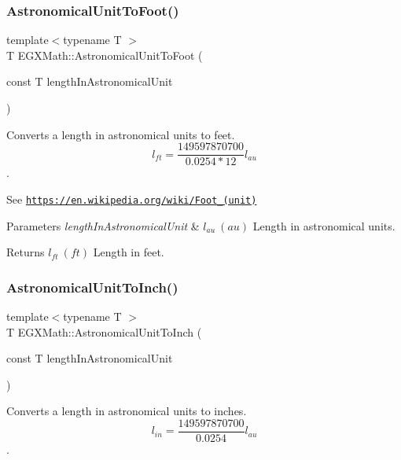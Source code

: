 \subsubsection{\texorpdfstring{Astronomical\+Unit\+To\+Foot()}{AstronomicalUnitToFoot()}}
{\footnotesize\ttfamily template$<$typename T $>$ \\
T E\+G\+X\+Math\+::\+Astronomical\+Unit\+To\+Foot (\begin{DoxyParamCaption}\item[{const T}]{length\+In\+Astronomical\+Unit }\end{DoxyParamCaption})}



Converts a length in astronomical units to feet. \[ l_{ft}= \frac{149597870700}{0.0254 * 12} l_{au} \]. 

See \href{https://en.wikipedia.org/wiki/Foot_(unit)}{\tt https\+://en.\+wikipedia.\+org/wiki/\+Foot\+\_\+(unit)} 
\begin{DoxyParams}{Parameters}
{\em length\+In\+Astronomical\+Unit} & $ l_{au}\ (au)$ Length in astronomical units. \\
\hline
\end{DoxyParams}
\begin{DoxyReturn}{Returns}
$ l_{ft}\ (ft)$ Length in feet. 
\end{DoxyReturn}
\mbox{\label{group___e_g_x_math-_conversions-_length_conversions-_astronomical-_astronomical_unit-_imperial_ga75ba3ea9f789b7d12627bc67e4a4e904}} 
\subsubsection{\texorpdfstring{Astronomical\+Unit\+To\+Inch()}{AstronomicalUnitToInch()}}
{\footnotesize\ttfamily template$<$typename T $>$ \\
T E\+G\+X\+Math\+::\+Astronomical\+Unit\+To\+Inch (\begin{DoxyParamCaption}\item[{const T}]{length\+In\+Astronomical\+Unit }\end{DoxyParamCaption})}



Converts a length in astronomical units to inches. \[ l_{in}= \frac{149597870700}{0.0254} l_{au} \]. 

